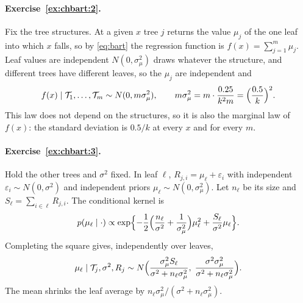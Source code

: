 \paragraph{Exercise~\ref{ex:chbart:2}.} Fix the tree structures. At a given $x$ tree $j$ returns the value $\mu_j$ of the one leaf into which $x$ falls, so by \eqref{eq:bart} the regression function is $f(x) = \sum_{j=1}^m \mu_j$. Leaf values are independent $N(0, \sigma_\mu^2)$ draws whatever the structure, and different trees have different leaves, so the $\mu_j$ are independent and
\[
f(x) \mid \mathcal{T}_1, \dots, \mathcal{T}_m \sim N(0, m\sigma_\mu^2), \qquad m\sigma_\mu^2 = m\cdot\frac{0.25}{k^2 m} = \Bigl(\frac{0.5}{k}\Bigr)^2.
\]
This law does not depend on the structures, so it is also the marginal law of $f(x)$: the standard deviation is $0.5/k$ at every $x$ and for every $m$. 

\paragraph{Exercise~\ref{ex:chbart:3}.} Hold the other trees and $\sigma^2$ fixed. In leaf $\ell$, $R_{j,i} = \mu_\ell + \varepsilon_i$ with independent $\varepsilon_i \sim N(0, \sigma^2)$ and independent priors $\mu_\ell \sim N(0, \sigma_\mu^2)$. Let $n_\ell$ be its size and $S_\ell = \sum_{i \in \ell}R_{j,i}$. The conditional kernel is
\[
p(\mu_\ell \mid \cdot) \propto \exp\Bigl\{-\frac12\Bigl(\frac{n_\ell}{\sigma^2} + \frac1{\sigma_\mu^2}\Bigr)\mu_\ell^2 + \frac{S_\ell}{\sigma^2}\mu_\ell\Bigr\}.
\]
Completing the square gives, independently over leaves,
\[
\mu_\ell \mid \mathcal{T}_j, \sigma^2, R_j \sim N\Bigl(\frac{\sigma_\mu^2 S_\ell}{\sigma^2 + n_\ell\sigma_\mu^2},\; \frac{\sigma^2\sigma_\mu^2}{\sigma^2 + n_\ell\sigma_\mu^2}\Bigr).
\]
The mean shrinks the leaf average by $n_\ell\sigma_\mu^2/(\sigma^2 + n_\ell\sigma_\mu^2)$.

